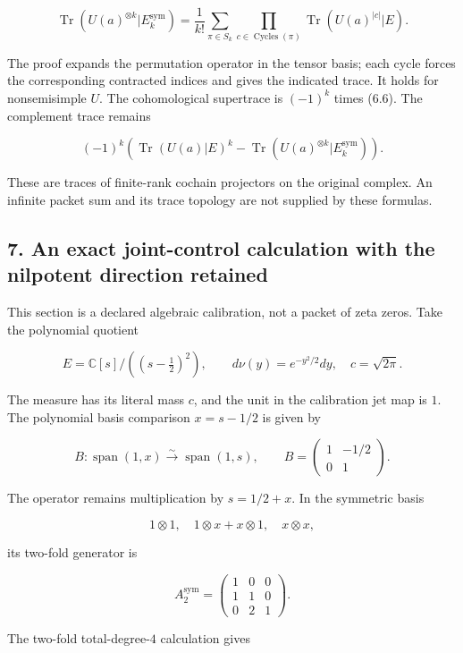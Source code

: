 \documentclass[
]{article}
\begin{document}
\[\boxed{\operatorname{Tr}(U(a)^{\otimes k}|E_k^{\mathrm{sym}})
=\frac1{k!}\sum_{\pi\in S_k}\prod_{c\in\operatorname{Cycles}(\pi)}
\operatorname{Tr}(U(a)^{|c|}|E).}\tag{6.6}\]

The proof expands the permutation operator in the tensor basis; each
cycle forces the corresponding contracted indices and gives the
indicated trace. It holds for nonsemisimple \(U\). The cohomological
supertrace is \((-1)^k\) times (6.6). The complement trace remains

\[(-1)^k\left(\operatorname{Tr}(U(a)|E)^k-
\operatorname{Tr}(U(a)^{\otimes k}|E_k^{\mathrm{sym}})\right).\tag{6.7}\]

These are traces of finite-rank cochain projectors on the original
complex. An infinite packet sum and its trace topology are not supplied
by these formulas.

\subsection{7. An exact joint-control calculation with the nilpotent
direction
retained}\label{an-exact-joint-control-calculation-with-the-nilpotent-direction-retained}

This section is a declared algebraic calibration, not a packet of zeta
zeros. Take the polynomial quotient

\[E=\mathbb C[s]/((s-\tfrac12)^2),\qquad d\nu(y)=e^{-y^2/2}dy,\quad c=\sqrt{2\pi}.\]

The measure has its literal mass \(c\), and the unit in the calibration
jet map is \(1\). The polynomial basis comparison \(x=s-1/2\) is given
by

\[B:\operatorname{span}(1,x)\xrightarrow{\sim}\operatorname{span}(1,s),\qquad
B=\begin{pmatrix}1&-1/2\\0&1\end{pmatrix}.\tag{7.1}\]

The operator remains multiplication by \(s=1/2+x\). In the symmetric
basis

\[1\otimes1,\quad 1\otimes x+x\otimes1,\quad x\otimes x,\]

its two-fold generator is

\[A_2^{\mathrm{sym}}=\begin{pmatrix}1&0&0\\1&1&0\\0&2&1\end{pmatrix}.\tag{7.2}\]

The two-fold total-degree-\(4\) calculation gives
\end{document}

